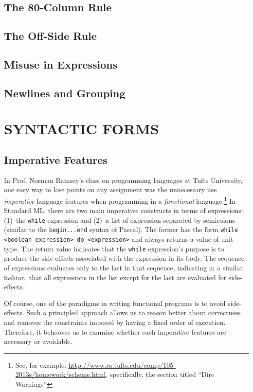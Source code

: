 \documentclass[12pt,abstracton]{scrartcl}
\begin{document}
\subsection{The 80-Column Rule}
\subsection{The Off-Side Rule}
\subsection{Misuse in Expressions}
\subsection{Newlines and Grouping}
\section{SYNTACTIC FORMS}\label{sec:syntax}
\subsection{Imperative Features}\label{subsec:imper}
In Prof. Norman Ramsey's class on programming languages at Tufts University, one easy way to lose points
on any assignment was the unnecessary use \emph{imperative} language features when programming in a \emph{functional} language.\footnote{See, for example: \url{http://www.cs.tufts.edu/comp/105-2013s/homework/scheme.html}, specifically, the section titled ``Dire Warnings''}
In Standard ML, there are two main imperative constructs in terms of expressions:
(1)~the \texttt{while} expression and (2)~a list of expression separated by semicolons (similar to the \texttt{begin...end} syntax of Pascal)\cite{Ull98}.
The former has the form \texttt{while <boolean-expression> do <expression>} and always returns a value of unit type.
The return value indicates that the \texttt{while} expression's purpose is to produce the side-effects associated
with the expression in its body. The sequence of expressions evaluates only to the last in that sequence, indicating
in a similar fashion, that all expressions in the list except for the last are evaluated for side-effects.

Of course, one of the paradigms in writing functional programs is to avoid side-effects.
Such a principled approach allows us to reason better about correctness and
removes the constraints imposed by having a fixed order of execution.\cite{Hug90} Therefore,
it behooves us to examine whether such imperative features are necessary or avoidable.
\end{document}
